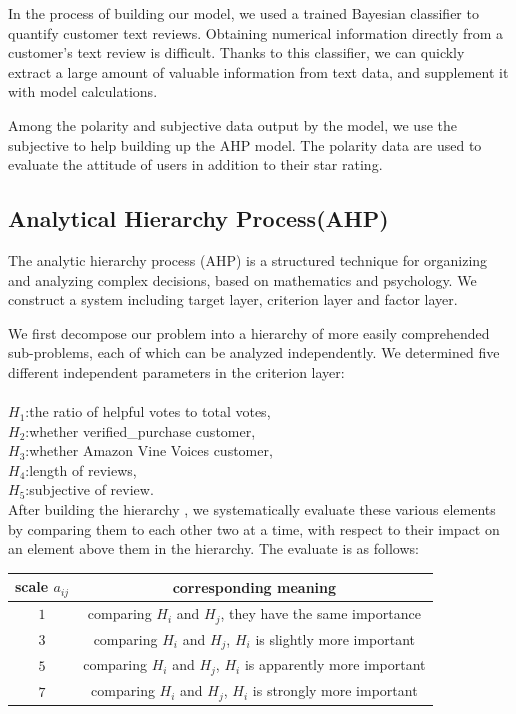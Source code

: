 \documentclass{mcmthesis}
\begin{document}
    In the process of building our model, we used a trained Bayesian classifier to quantify customer text reviews. Obtaining numerical information directly from a customer's text review is difficult. Thanks to this classifier, we can quickly extract a large amount of valuable information from text data, and supplement it with model calculations.
    
    Among the polarity and subjective data output by the model, we use the subjective to help building up the AHP model. The polarity data are used to evaluate the attitude of users in addition to their star rating.


\subsection{Analytical Hierarchy Process(AHP)}
    The analytic hierarchy process (AHP) is a structured technique for organizing and analyzing complex decisions, based on mathematics and psychology.\cite{ref:AHP} We construct a system including target layer, criterion layer and factor layer.
    
    We first decompose our problem into a hierarchy of more easily comprehended sub-problems, each of which can be analyzed independently. We determined five different independent parameters in the criterion layer:\\\\
    $H_1$:the ratio of helpful votes to total votes, \\
    $H_2$:whether verified\_purchase customer, \\
    $H_3$:whether Amazon Vine Voices customer,\\ 
    $H_4$:length of reviews, \\
    $H_5$:subjective of review.\\
    
    After building the hierarchy , we systematically evaluate these various elements by comparing them to each other two at a time, with respect to their impact on an element above them in the hierarchy. The evaluate is as follows:
\begin{center}
    \begin{tabular}{|c|c|}
        \hline
            scale $a_{ij}$ & corresponding meaning \\
        \hline
           $1$ & comparing $H_i$ and $H_j$, they have the same importance\\
        \hline
           $3$ & comparing $H_i$ and $H_j$, $H_i$ is slightly more important\\
         \hline
           $5$ & comparing $H_i$ and $H_j$, $H_i$ is apparently more important\\
         \hline
           $7$ & comparing $H_i$ and $H_j$, $H_i$ is strongly more important\\
         \hline
    \end{tabular}
\end{center}
    
\end{document}
